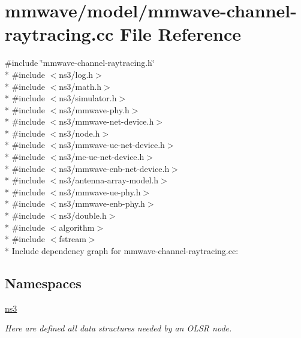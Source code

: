 \hypertarget{mmwave-channel-raytracing_8cc}{}\section{mmwave/model/mmwave-\/channel-\/raytracing.cc File Reference}
\label{mmwave-channel-raytracing_8cc}
{\ttfamily \#include \char`\"{}mmwave-\/channel-\/raytracing.\+h\char`\"{}}\\*
{\ttfamily \#include $<$ns3/log.\+h$>$}\\*
{\ttfamily \#include $<$ns3/math.\+h$>$}\\*
{\ttfamily \#include $<$ns3/simulator.\+h$>$}\\*
{\ttfamily \#include $<$ns3/mmwave-\/phy.\+h$>$}\\*
{\ttfamily \#include $<$ns3/mmwave-\/net-\/device.\+h$>$}\\*
{\ttfamily \#include $<$ns3/node.\+h$>$}\\*
{\ttfamily \#include $<$ns3/mmwave-\/ue-\/net-\/device.\+h$>$}\\*
{\ttfamily \#include $<$ns3/mc-\/ue-\/net-\/device.\+h$>$}\\*
{\ttfamily \#include $<$ns3/mmwave-\/enb-\/net-\/device.\+h$>$}\\*
{\ttfamily \#include $<$ns3/antenna-\/array-\/model.\+h$>$}\\*
{\ttfamily \#include $<$ns3/mmwave-\/ue-\/phy.\+h$>$}\\*
{\ttfamily \#include $<$ns3/mmwave-\/enb-\/phy.\+h$>$}\\*
{\ttfamily \#include $<$ns3/double.\+h$>$}\\*
{\ttfamily \#include $<$algorithm$>$}\\*
{\ttfamily \#include $<$fstream$>$}\\*
Include dependency graph for mmwave-\/channel-\/raytracing.cc\+:
\subsection*{Namespaces}
\begin{DoxyCompactItemize}
\item 
 \hyperlink{namespacens3}{ns3}
\begin{DoxyCompactList}\small\item\em Here are defined all data structures needed by an O\+L\+SR node. \end{DoxyCompactList}\end{DoxyCompactItemize}

